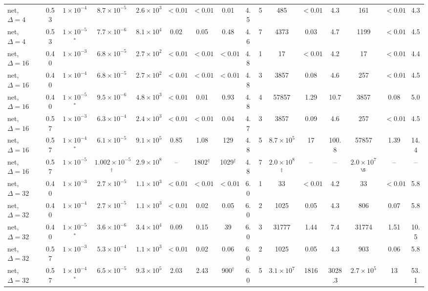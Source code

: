 \begin{table}[t]
\begin{ruledtabular}
\begin{tabular}{lcc|cccccc|cccc|ccc}
net, $\Delta=4$ & 0.53 & $1\times10^{-4}$ & $8.7\times10^{-5}$ & $2.6\times10^{3}$ & $<0.01$ & $<0.01$ & 0.01 & 4.5 & 5 & 485 & $<0.01$ & 4.3 & 161 & $<0.01$ & 4.3 \\
net, $\Delta=4$ & 0.53 & $1\times10^{-5}$$^*$ & $7.7\times10^{-6}$ & $8.1\times10^{4}$ & 0.02 & 0.05 & 0.48 & 4.6 & 7 & 4373 & 0.03 & 4.7 & 1199 & $<0.01$ & 4.5 \\
net, $\Delta=16$ & 0.40 & $1\times10^{-3}$ & $6.8\times10^{-5}$ & $2.7\times10^{2}$ & $<0.01$ & $<0.01$ & $<0.01$ & 4.8 & 1 & 17 & $<0.01$ & 4.2 & 17 & $<0.01$ & 4.4 \\
net, $\Delta=16$ & 0.40 & $1\times10^{-4}$ & $6.8\times10^{-5}$ & $2.7\times10^{2}$ & $<0.01$ & $<0.01$ & $<0.01$ & 4.8 & 3 & 3857 & 0.08 & 4.6 & 257 & $<0.01$ & 4.5 \\
net, $\Delta=16$ & 0.40 & $1\times10^{-5}$$^*$ & $9.5\times10^{-6}$ & $4.8\times10^{3}$ & $<0.01$ & 0.01 & 0.93 & 4.8 & 4 & 57857 & 1.29 & 10.7 & 3857 & 0.08 & 5.0 \\
net, $\Delta=16$ & 0.57 & $1\times10^{-3}$ & $6.3\times10^{-4}$ & $2.4\times10^{3}$ & $<0.01$ & $<0.01$ & 0.04 & 4.7 & 3 & 3857 & 0.09 & 4.6 & 257 & $<0.01$ & 4.5 \\
net, $\Delta=16$ & 0.57 & $1\times10^{-4}$$^*$ & $6.1\times10^{-5}$ & $9.1\times10^{5}$ & 0.85 & 1.08 & 129 & 4.8 & 5 & $8.7\times10^{5}$ & 17 & 100.8 & 57857 & 1.39 & 14.4 \\
net, $\Delta=16$ & 0.57 & $1\times10^{-5}$ & $1.002\times10^{-5}$$^{\dagger}$ & $2.9\times10^{8}$ & -- & 1802$^{\dagger}$ & 1029$^{\dagger}$ & 4.8 & 7 & $2.0\times10^{8}$$^{\ddagger}$ & -- & -- & $2.0\times10^{7}$$^{\S}$ & -- & -- \\
net, $\Delta=32$ & 0.40 & $1\times10^{-3}$ & $2.7\times10^{-5}$ & $1.1\times10^{3}$ & $<0.01$ & $<0.01$ & $<0.01$ & 6.0 & 1 & 33 & $<0.01$ & 4.2 & 33 & $<0.01$ & 5.8 \\
net, $\Delta=32$ & 0.40 & $1\times10^{-4}$ & $2.7\times10^{-5}$ & $1.1\times10^{3}$ & $<0.01$ & 0.02 & 0.05 & 6.0 & 2 & 1025 & 0.05 & 4.3 & 806 & 0.07 & 5.8 \\
net, $\Delta=32$ & 0.40 & $1\times10^{-5}$$^*$ & $3.6\times10^{-6}$ & $3.4\times10^{4}$ & 0.09 & 0.15 & 39 & 6.0 & 3 & 31777 & 1.44 & 7.4 & 31774 & 1.51 & 10.5 \\
net, $\Delta=32$ & 0.57 & $1\times10^{-3}$ & $5.3\times10^{-4}$ & $1.1\times10^{3}$ & $<0.01$ & 0.02 & 0.06 & 6.0 & 2 & 1025 & 0.05 & 4.3 & 903 & 0.06 & 5.8 \\
net, $\Delta=32$ & 0.57 & $1\times10^{-4}$$^*$ & $6.5\times10^{-5}$ & $9.3\times10^{5}$ & 2.03 & 2.43 & 900$^{\dagger}$ & 6.0 & 5 & $3.1\times10^{7}$ & 1816 & 3028.3 & $2.7\times10^{5}$ & 13 & 53.1 \\

\end{tabular}
\end{ruledtabular}
\end{table}
